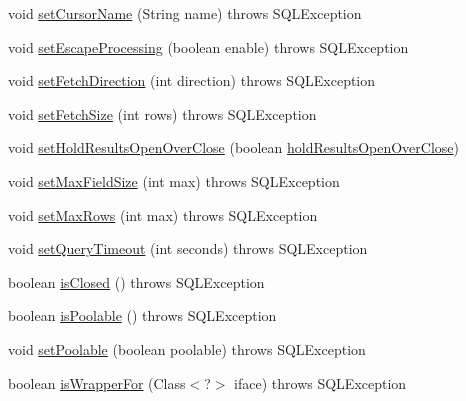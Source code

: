 \begin{DoxyCompactItemize}
\item 
void \mbox{\hyperlink{classcom_1_1mysql_1_1cj_1_1jdbc_1_1_statement_impl_a60cd7b41aa7098febdb3f9af3aa40423}{set\+Cursor\+Name}} (String name)  throws S\+Q\+L\+Exception 
\item 
void \mbox{\hyperlink{classcom_1_1mysql_1_1cj_1_1jdbc_1_1_statement_impl_a177506cc06af0885ffceef360e697bb0}{set\+Escape\+Processing}} (boolean enable)  throws S\+Q\+L\+Exception 
\item 
void \mbox{\hyperlink{classcom_1_1mysql_1_1cj_1_1jdbc_1_1_statement_impl_a5f61e150957f4bdfa9682061008d448f}{set\+Fetch\+Direction}} (int direction)  throws S\+Q\+L\+Exception 
\item 
void \mbox{\hyperlink{classcom_1_1mysql_1_1cj_1_1jdbc_1_1_statement_impl_ad68efa27b29ed10cdc35f711dad0d16f}{set\+Fetch\+Size}} (int rows)  throws S\+Q\+L\+Exception 
\item 
void \mbox{\hyperlink{classcom_1_1mysql_1_1cj_1_1jdbc_1_1_statement_impl_a903fdf158910d8f86a7417699ac93064}{set\+Hold\+Results\+Open\+Over\+Close}} (boolean \mbox{\hyperlink{classcom_1_1mysql_1_1cj_1_1jdbc_1_1_statement_impl_a3313b50d4d597415d14dedd1620de480}{hold\+Results\+Open\+Over\+Close}})
\item 
void \mbox{\hyperlink{classcom_1_1mysql_1_1cj_1_1jdbc_1_1_statement_impl_ab0013f973a2fe60cb9cdbfa6f53486e6}{set\+Max\+Field\+Size}} (int max)  throws S\+Q\+L\+Exception 
\item 
void \mbox{\hyperlink{classcom_1_1mysql_1_1cj_1_1jdbc_1_1_statement_impl_ab0226070ba29ae3c0cf7431d7b902c01}{set\+Max\+Rows}} (int max)  throws S\+Q\+L\+Exception 
\item 
void \mbox{\hyperlink{classcom_1_1mysql_1_1cj_1_1jdbc_1_1_statement_impl_a4bc4a551083ec1e3a3cabcea2da922ad}{set\+Query\+Timeout}} (int seconds)  throws S\+Q\+L\+Exception 
\item 
boolean \mbox{\hyperlink{classcom_1_1mysql_1_1cj_1_1jdbc_1_1_statement_impl_affaded3f0d3bc5a4ff0d80928ddfd8bc}{is\+Closed}} ()  throws S\+Q\+L\+Exception 
\item 
boolean \mbox{\hyperlink{classcom_1_1mysql_1_1cj_1_1jdbc_1_1_statement_impl_af6867cf70a7da2cf3141b4435116faeb}{is\+Poolable}} ()  throws S\+Q\+L\+Exception 
\item 
void \mbox{\hyperlink{classcom_1_1mysql_1_1cj_1_1jdbc_1_1_statement_impl_ac5a27f06b5bc99195e039732366a33f5}{set\+Poolable}} (boolean poolable)  throws S\+Q\+L\+Exception 
\item 
boolean \mbox{\hyperlink{classcom_1_1mysql_1_1cj_1_1jdbc_1_1_statement_impl_a403bf25ba81ab01a60bdb9f2d4b4cfed}{is\+Wrapper\+For}} (Class$<$?$>$ iface)  throws S\+Q\+L\+Exception 

\end{DoxyCompactItemize}
